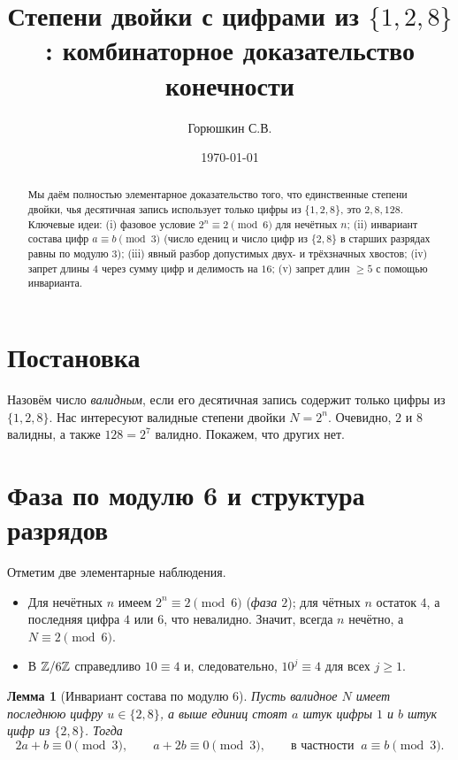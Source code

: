 \documentclass[12pt]{article}
\title{Степени двойки с цифрами из $\{1,2,8\}$: комбинаторное доказательство конечности}
\author{Горюшкин С.В.}
\date{\today}
\theoremstyle{plain}
\newtheorem{lemma}{Лемма}
\theoremstyle{remark}
\begin{document}
\maketitle

\begin{abstract}
Мы даём полностью элементарное доказательство того, что единственные степени двойки, чья десятичная запись использует только цифры из $\{1,2,8\}$, это $2,8,128$. Ключевые идеи: (i) фазовое условие $2^n\equiv2\pmod6$ для нечётных $n$; (ii) инвариант состава цифр $a\equiv b\pmod3$ (число едениц и число цифр из $\{2,8\}$ в старших разрядах равны по модулю $3$); (iii) явный разбор допустимых двух- и трёхзначных хвостов; (iv) запрет длины $4$ через сумму цифр и делимость на $16$; (v) запрет длин $\ge5$ с помощью инварианта.
\end{abstract}

\section{Постановка}
Назовём число \emph{валидным}, если его десятичная запись содержит только цифры из $\{1,2,8\}$. Нас интересуют валидные степени двойки $N=2^n$. Очевидно, $2$ и $8$ валидны, а также $128=2^7$ валидно. Покажем, что других нет.

\section{Фаза по модулю 6 и структура разрядов}
Отметим две элементарные наблюдения.
\begin{itemize}[nosep]
\item Для нечётных $n$ имеем $2^n\equiv 2\pmod6$ (\emph{фаза $2$}); для чётных $n$ остаток $4$, а последняя цифра $4$ или $6$, что невалидно. Значит, всегда $n$ нечётно, а $N\equiv2\pmod6$.
\item В $\Bbb Z/6\Bbb Z$ справедливо $10\equiv4$ и, следовательно, $10^j\equiv4$ для всех $j\ge1$.
\end{itemize}

\begin{lemma}[Инвариант состава по модулю 6]\label{lem:inv}
Пусть валидное $N$ имеет последнюю цифру $u\in\{2,8\}$, а выше единиц стоят $a$ штук цифры $1$ и $b$ штук цифр из $\{2,8\}$. Тогда
\begin{equation}\label{eq:ab}
2a+b\equiv0\pmod3,\qquad a+2b\equiv0\pmod3,\qquad\text{в частности }~ a\equiv b\pmod3.
\end{equation}
\end{lemma}
\end{document}
